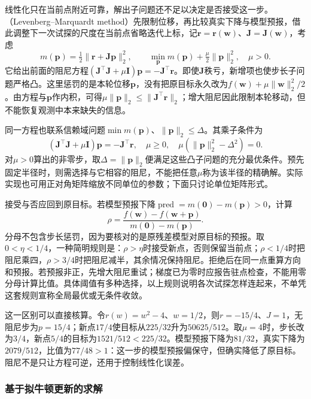 线性化只在当前点附近可靠，解出子问题还不足以决定是否接受这一步。（Levenberg--Marquardt method）先限制位移，再比较真实下降与模型预报，借此调整下一次试探的尺度在当前点省略迭代上标，记$\bm r=\bm r(\bm w)$、$\bm J=\bm J(\bm w)$，考虑
\[
 m(\bm p)=\tfrac12\|\bm r+\bm J\bm p\|_2^2,
 \qquad
 \min_{\bm p}m(\bm p)+\tfrac\mu2\|\bm p\|_2^2,
 \quad\mu>0.
\]
它给出前面的阻尼方程$(\bm J^\top\bm J+\mu\bm I)\bm p=-\bm J^\top\bm r$。即使$\bm J$秩亏，新增项也使步长子问题严格凸。这里惩罚的是本轮位移$\bm p$，没有把原目标永久改为$f(\bm w)+\mu\|\bm w\|_2^2/2$。由方程与$\bm p$作内积，可得$\mu\|\bm p\|_2\leq\|\bm J^\top\bm r\|_2$；增大阻尼因此限制本轮移动，但不能恢复观测中本来缺失的信息。

同一方程也联系信赖域问题$\min m(\bm p)$、$\|\bm p\|_2\leq\Delta$。其乘子条件为
\[
 (\bm J^\top\bm J+\mu\bm I)\bm p=-\bm J^\top\bm r,
 \quad \mu\geq0,
 \quad \mu(\|\bm p\|_2^2-\Delta^2)=0.
\]
对$\mu>0$算出的非零步，取$\Delta=\|\bm p\|_2$便满足这些凸子问题的充分最优条件。预先固定半径时，则需选择与它相容的阻尼，不能把任意$\mu$称为该半径的精确解。实际实现也可用正对角矩阵缩放不同单位的参数；下面只讨论单位矩阵形式。

接受与否应回到原目标。若模型预报下降$\operatorname{pred}=m(\bm0)-m(\bm p)>0$，计算
\begin{equation}
 \rho=\frac{f(\bm w)-f(\bm w+\bm p)}{m(\bm0)-m(\bm p)}.
 \label{eq:opt-lm-reduction-ratio}
\end{equation}
分母不包含步长惩罚，因为要核对的是原残差模型对原目标的预报。取$0<\eta<1/4$，一种简明规则是：$\rho>\eta$时接受新点，否则保留当前点；$\rho<1/4$时把阻尼乘四，$\rho>3/4$时把阻尼减半，其余情况保持阻尼。拒绝后在同一点重算方向和预报。若预报非正，先增大阻尼重试；梯度已为零时应报告驻点检查，不能用零分母计算比值。具体阈值有多种选择，以上规则说明各次试探怎样连起来，不单凭这套规则宣称全局最优或无条件收敛。

这一区别可以直接核算。令$r(w)=w^2-4$、$w=1/2$，则$r=-15/4$、$J=1$，无阻尼步为$p=15/4$；新点$17/4$使目标从$225/32$升为$50625/512$。取$\mu=4$时，步长改为$3/4$，新点$5/4$的目标为$1521/512<225/32$。模型预报下降为$81/32$，真实下降为$2079/512$，比值为$77/48>1$：这一步的模型预报偏保守，但确实降低了原目标。阻尼不是只让方程可逆，还用于控制线性化误差。


\subsubsection{基于拟牛顿更新的求解}
\label{sec:opt-quasi-newton}

